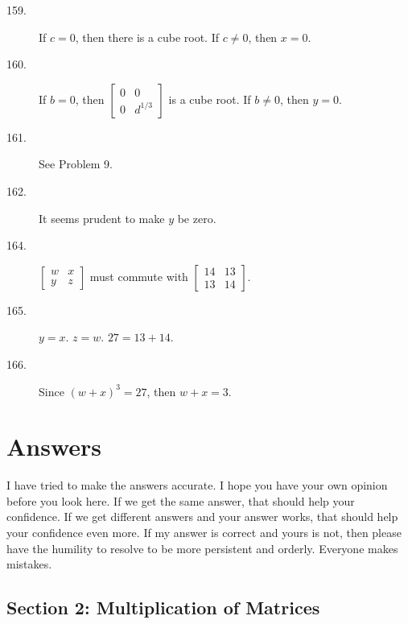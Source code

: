 \documentclass{article}
\begin{document}
\begin{description}

  \item[159.] If $c = 0$, then there is a cube root. If $c \neq 0$, then $x = 0$.

  \item[160.] If $b = 0$, then $\begin{bmatrix} 0 & 0 \\ 0 & d^{1/3} \end{bmatrix}$ is a cube root. If $b \neq 0$, then $y = 0$.

  \item[161.] See Problem 9.

  \item[162.] It seems prudent to make $y$ be zero.

  \item[164.] $\begin{bmatrix} w & x \\ y & z \end{bmatrix}$ must commute with $\begin{bmatrix} 14 & 13 \\ 13 & 14 \end{bmatrix}$.

  \item[165.] $y = x$. $z = w$. $27 = 13 + 14$.

  \item[166.] Since $(w+x)^3 = 27$, then $w+x = 3$.

\end{description}




\newpage

\section{Answers}

I have tried to make the answers accurate. I hope you have your own opinion before you look here. If we get the same answer, that should help your confidence. If we get different answers and your answer works, that should help your confidence even more. If my answer is correct and yours is not, then please have the humility to resolve to be more persistent and orderly. Everyone makes mistakes.


\subsection*{Section 2: Multiplication of Matrices}
\end{document}
